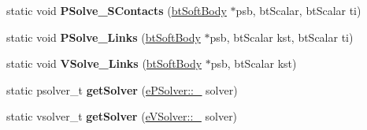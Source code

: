 \begin{DoxyCompactItemize}
\item 
\hypertarget{classbt_soft_body_a03cec6f0910a538cbc1a54bb4aaeea42}{static void {\bfseries P\+Solve\+\_\+\+S\+Contacts} (\hyperlink{classbt_soft_body}{bt\+Soft\+Body} $\ast$psb, bt\+Scalar, bt\+Scalar ti)}\label{classbt_soft_body_a03cec6f0910a538cbc1a54bb4aaeea42}

\item 
\hypertarget{classbt_soft_body_a0097a8dcdbf3edf51c896348e7f6d075}{static void {\bfseries P\+Solve\+\_\+\+Links} (\hyperlink{classbt_soft_body}{bt\+Soft\+Body} $\ast$psb, bt\+Scalar kst, bt\+Scalar ti)}\label{classbt_soft_body_a0097a8dcdbf3edf51c896348e7f6d075}

\item 
\hypertarget{classbt_soft_body_a5d1bc8003163e9f8a79e94fc2def5d70}{static void {\bfseries V\+Solve\+\_\+\+Links} (\hyperlink{classbt_soft_body}{bt\+Soft\+Body} $\ast$psb, bt\+Scalar kst)}\label{classbt_soft_body_a5d1bc8003163e9f8a79e94fc2def5d70}

\item 
\hypertarget{classbt_soft_body_ae2ab143e48d092e818a3b4180016f469}{static psolver\+\_\+t {\bfseries get\+Solver} (\hyperlink{structbt_soft_body_1_1e_p_solver_a5d6ab41a09da7333bc2047b4ea14bf86}{e\+P\+Solver\+::\+\_\+} solver)}\label{classbt_soft_body_ae2ab143e48d092e818a3b4180016f469}

\item 
\hypertarget{classbt_soft_body_ad6063e28f3c00c308baf4f1ea8b161d3}{static vsolver\+\_\+t {\bfseries get\+Solver} (\hyperlink{structbt_soft_body_1_1e_v_solver_ad6a7083f91529d75cab91506cd63e088}{e\+V\+Solver\+::\+\_\+} solver)}\label{classbt_soft_body_ad6063e28f3c00c308baf4f1ea8b161d3}

\end{DoxyCompactItemize}
